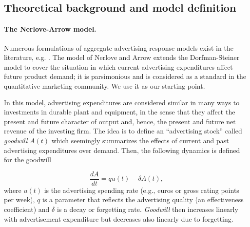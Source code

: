 


\subsection{Theoretical background and model definition}\label{sec:nerlove}


\paragraph{The Nerlove-Arrow model.}


Numerous formulations of aggregate advertising response models exist in the  literature, e.g. \parencite{little1979aggregate}. The model of Nerlove and Arrow \parencite{nerlove1962optimal} extends the Dorfman-Steiner model to cover the situation in which current advertising expenditures affect future product demand; it is parsimonious and is considered as a standard in the quantitative marketing community. We use it as our starting point.

In this model, advertising expenditures are considered similar in many ways to investments in durable plant and equipment, in the sense that they affect the present and future character of output and, hence, the present and future net revenue of the investing firm. The idea is to define an ``advertising stock'' called \emph{goodwill}  $A(t)$ which seemingly summarizes the effects of current and past advertising expenditures over demand. Then, the following dynamics is defined for the goodwill

\begin{equation}\label{eq:NA}
\frac{dA}{dt} = qu(t) - \delta A(t),
\end{equation}
where $u(t)$ is the advertising spending rate (e.g., euros or gross rating points per week), $q$ is a parameter that reflects the advertising quality (an effectiveness coefficient) and $\delta$ is a decay or forgetting rate. \emph{Goodwill} then increases linearly with  advertisement expenditure but decreases also linearly due to forgetting. %

